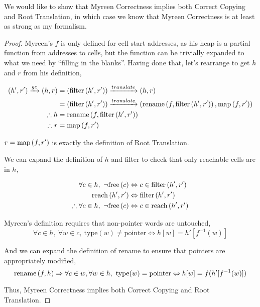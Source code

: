 \begin{theorem}
  We would like to show that Myreen Correctness implies both Correct
  Copying and Root Translation, in which case we know that Myreen
  Correctness is at least as strong as my formalism.

  \begin{proof}
    Myreen's $f$ is only defined for cell start addresses, as his heap
    is a partial function from addresses to cells, but the function
    can be trivially expanded to what we need by ``filling in the
    blanks''. Having done that, let's rearrange to get $h$ and $r$
    from his definition,

    \begin{align*}
      (h', r') \xrightarrow{gc} (h, r) &= (\mathrm{filter}\left(h', r'\right)) \xrightarrow{translate} (h, r)\\
      &= (\mathrm{filter}\left(h', r'\right)) \xrightarrow{translate} (\mathrm{rename}\left(f, \mathrm{filter}\left(h', r'\right)\right), \mathrm{map}\left(f, r'\right))\\
      \therefore h &= \mathrm{rename}\left(f, \mathrm{filter}\left(h', r'\right)\right)\\
      \therefore r &= \mathrm{map}\left(f, r'\right)
    \end{align*}

    $r = \mathrm{map}\left(f, r'\right)$ is exactly the definition of Root Translation.

    We can expand the definition of $h$ and filter to check that only
    reachable cells are in $h$,

    \begin{align*}
      \forall c \in h,\ \lnot\mathrm{free}\left(c\right) &\Leftrightarrow c \in \mathrm{filter}\left(h', r'\right)\\
      \mathrm{reach}\left(h', r'\right) &\Leftrightarrow \mathrm{filter}\left(h', r'\right)\\
      \therefore \forall c \in h,\ \lnot\mathrm{free}\left(c\right) &\Leftrightarrow c \in \mathrm{reach}\left(h', r'\right)
    \end{align*}

    Myreen's definition requires that non-pointer words are
    untouched, \[\forall c \in h,\ \forall w \in c,\ \mathrm{type}(w)
    \neq \mathrm{pointer} \iff h[w] = h'[f^{-1}(w)]\]

    And we can expand the definition of rename to ensure that pointers
    are appropriately modified, \[\mathrm{rename}\left(f, h\right) \Rightarrow \forall c \in
    w, \forall w \in h,\ \mathrm{type}(w) = \mathrm{pointer} \Leftrightarrow h[w]
    = f(h'[f^{-1}(w)])\]

    Thus, Myreen Correctness implies both Correct Copying and Root
    Translation.
  \end{proof}
\end{theorem}

